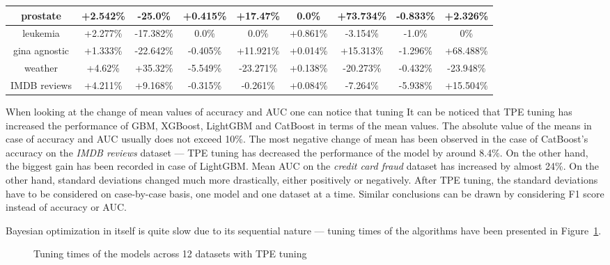 \documentclass[magisterska, english]{pwr_wmat_praca_dyplomowa}
\theoremstyle{plain}
\numberwithin{theorem}{chapter}
\theoremstyle{definition}
\numberwithin{theorem}{chapter}
\newcommand{\gbm}{GBM, XGBoost, LightGBM and CatBoost }
\begin{document}
\begin{sidewaystable}
\begin{tabular}{c|cccccccc}
prostate & +2.542\% & -25.0\% & +0.415\% & +17.47\% & 0.0\% & +73.734\% & -0.833\% & +2.326\%\\ \hline
leukemia & +2.277\% & -17.382\% & 0.0\% & 0.0\% & +0.861\% & -3.154\% & -1.0\% & 0\%\\ \hline
gina agnostic & +1.333\% & -22.642\% & -0.405\% & +11.921\% & +0.014\% & +15.313\% & -1.296\% & +68.488\%\\ \hline
weather & +4.62\% & +35.32\% & -5.549\% & -23.271\% & +0.138\% & -20.273\% & -0.432\% & -23.948\%\\ \hline
IMDB reviews & +4.211\% & +9.168\% & -0.315\% & -0.261\% & +0.084\% & -7.264\% & -5.938\% & +15.504\%\\ \hline
\end{tabular}
\caption{Percentage gain/loss of values of means and standard deviations of AUC --- TPE tuning vs no tuning}
\label{tab:no_tuning_tpe_AUC_diff}
   \end{sidewaystable}
   
When looking at the change of mean values of accuracy and AUC one can notice that tuning
It can be noticed that TPE tuning has increased the performance of \gbm in terms of the mean values. The absolute value of the means in case of accuracy and AUC usually does not exceed 10\%. The most negative change of mean has been observed in the case of CatBoost's accuracy on the \emph{IMDB reviews} dataset --- TPE tuning has decreased the performance of the model by around 8.4\%. On the other hand, the biggest gain has been recorded in case of LightGBM. Mean AUC on the \emph{credit card fraud} dataset has increased by almost 24\%. On the other hand, standard deviations changed much more drastically, either positively or negatively. After TPE tuning, the standard deviations have to be considered on case-by-case basis, one model and one dataset at a time. Similar conclusions can be drawn by considering F1 score instead of accuracy or AUC.

Bayesian optimization in itself is quite slow due to its sequential nature --- tuning times of the algorithms have been presented in Figure~\ref{fig:tpe_tuning_times}.

\begin{figure}[H]
	\centering
	\caption{Tuning times of the models across 12 datasets with TPE tuning}
	\label{fig:tpe_tuning_times}
\end{figure}
\end{document}

